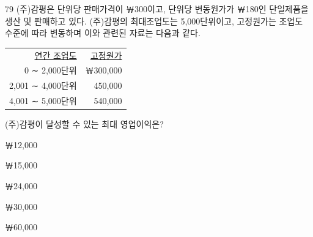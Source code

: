 \begin{question}{79}
(주)감평은 단위당 판매가격이 ￦300이고, 단위당 변동원가가 ￦180인 단일제품을 생산 및 판매하고 있다. (주)감평의 최대조업도는 5,000단위이고, 고정원가는 조업도 수준에 따라 변동하며 이와 관련된 자료는 다음과 같다.
\par{\small\centering
\begin{tabular}{@{}r@{\qquad}r@{}}
\hline
\uline{연간 조업도} & \uline{고정원가} \\
0 ∼ 2,000단위 & ￦300,000 \\
2,001 ∼ 4,000단위 & 450,000 \\
4,001 ∼ 5,000단위 & 540,000 \\
\hline
\end{tabular}\par}
(주)감평이 달성할 수 있는 최대 영업이익은? \par
\begin{choices}
  \item ￦12,000
  \item ￦15,000
  \item ￦24,000
  \item ￦30,000
  \item ￦60,000
\end{choices}
\end{question}
